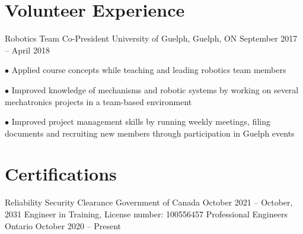 \documentclass[a4paper,11pt]{article}
\newcommand{\sectionsep}{\vspace{-2.5mm}}
\begin{document}
\resumeSubHeadingListEnd
\sectionsep
\section{Volunteer Experience}
\resumeSubHeadingListStart

\resumeExp
{Robotics Team Co-President}
{University of Guelph, Guelph, ON}
{September 2017 -- April 2018} %
{}
\resumeItemListStart
\item[$\bullet$] Applied course concepts while teaching and leading robotics team members
\item[$\bullet$] Improved knowledge of mechanisms and robotic systems by working on several mechatronics
projects in a team-based environment
\item[$\bullet$] Improved project management skills by running weekly meetings, filing documents and
recruiting new members through participation in Guelph events
\resumeItemListEnd
\resumeSubHeadingListEnd

\section{Certifications}
\resumeSubHeadingListStart

\resumeCert
{Reliability Security Clearance}
{Government of Canada}
{October 2021 -- October, 2031}
\resumeCert
{Engineer in Training, License number: 100556457}
{Professional Engineers Ontario}
{October 2020 -- Present}
\resumeSubHeadingListEnd
\end{document}
